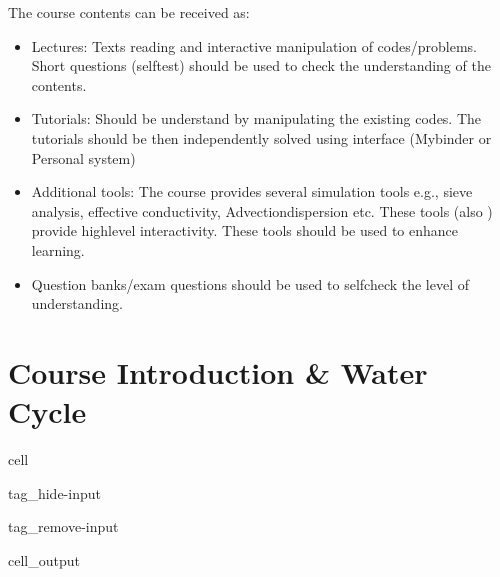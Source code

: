 \documentclass[letterpaper,10pt,english]{jupyterBook}
\begin{document}
\sphinxAtStartPar
The course contents can be received as:
\begin{itemize}
\item {} 
\sphinxAtStartPar
Lectures: Texts reading and interactive manipulation of codes/problems. Short questions (self\sphinxhyphen{}test) should be used to check the understanding of the contents.

\item {} 
\sphinxAtStartPar
Tutorials: Should be understand by manipulating the existing codes. The tutorials should be then independently solved using  interface (Mybinder or Personal system)

\item {} 
\sphinxAtStartPar
Additional tools: The course provides several simulation tools\sphinxhyphen{} e.g., sieve analysis, effective conductivity, Advection\sphinxhyphen{}dispersion etc. These tools (also ) provide high\sphinxhyphen{}level interactivity. These tools should be used to enhance learning.

\item {} 
\sphinxAtStartPar
Question banks/exam questions should be used to self\sphinxhyphen{}check the level of understanding.

\end{itemize}

\sphinxstepscope


\chapter{Course Introduction \& Water Cycle}
\label{\detokenize{content/background/03_basic_hydrogeology:course-introduction-water-cycle}}\label{\detokenize{content/background/03_basic_hydrogeology::doc}}
\sphinxAtStartPar
{}

\begin{sphinxuseclass}{cell}
\begin{sphinxuseclass}{tag_hide-input}
\begin{sphinxuseclass}{tag_remove-input}\begin{sphinxVerbatimOutput}

\begin{sphinxuseclass}{cell_output}
\end{sphinxuseclass}\end{sphinxVerbatimOutput}

\end{sphinxuseclass}
\end{sphinxuseclass}
\end{sphinxuseclass}
\end{document}
